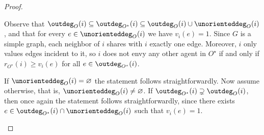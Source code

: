 \documentclass[11pt,letterpaper]{article}
\begin{document}
\begin{proof}
    \begin{nestedproof}
        Observe that $\outdeg_O(i) \subseteq \outdeg_{O^\star}(i) \subseteq \outdeg_O(i) \cup \unorienteddeg_O(i)$,
        and that for every $e \in \unorienteddeg_O(i)$ we have $v_i(e) = 1$.
        Since $G$ is a simple graph, each neighbor of $i$ shares with $i$ exactly one edge.
        Moreover, $i$ only values edges incident to it, so $i$ does not envy any other agent in $O^\star$
        if and only if $r_{O^\star}(i) \ge v_i(e)$ for all $e \in \outdeg_{O^\star}(i)$.

        If $\unorienteddeg_O(i) = \varnothing$ the statement follows straightforwardly.
        Now assume otherwise, that is, $\unorienteddeg_O(i) \neq \varnothing$.
        If $\outdeg_{O^\star}(i) \supsetneq \outdeg_O(i)$, then once again the statement follows
        straightforwardly, since there exists $e \in \outdeg_{O^\star}(i) \cap \unorienteddeg_O(i)$ such that $v_i(e) = 1$.


\end{nestedproof}
\end{proof}
\end{document}

